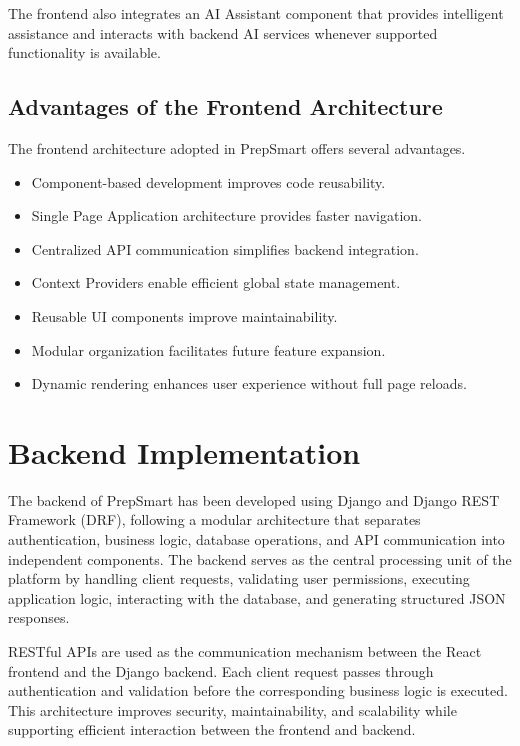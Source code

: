The frontend also integrates an AI Assistant component that provides intelligent assistance and interacts with backend AI services whenever supported functionality is available.

\subsection{Advantages of the Frontend Architecture}

The frontend architecture adopted in PrepSmart offers several advantages.

\begin{itemize}

\item Component-based development improves code reusability.

\item Single Page Application architecture provides faster navigation.

\item Centralized API communication simplifies backend integration.

\item Context Providers enable efficient global state management.

\item Reusable UI components improve maintainability.

\item Modular organization facilitates future feature expansion.

\item Dynamic rendering enhances user experience without full page reloads.

\end{itemize}

\section{Backend Implementation}

The backend of PrepSmart has been developed using Django and Django REST Framework (DRF), following a modular architecture that separates authentication, business logic, database operations, and API communication into independent components. The backend serves as the central processing unit of the platform by handling client requests, validating user permissions, executing application logic, interacting with the database, and generating structured JSON responses.

RESTful APIs are used as the communication mechanism between the React frontend and the Django backend. Each client request passes through authentication and validation before the corresponding business logic is executed. This architecture improves security, maintainability, and scalability while supporting efficient interaction between the frontend and backend.

